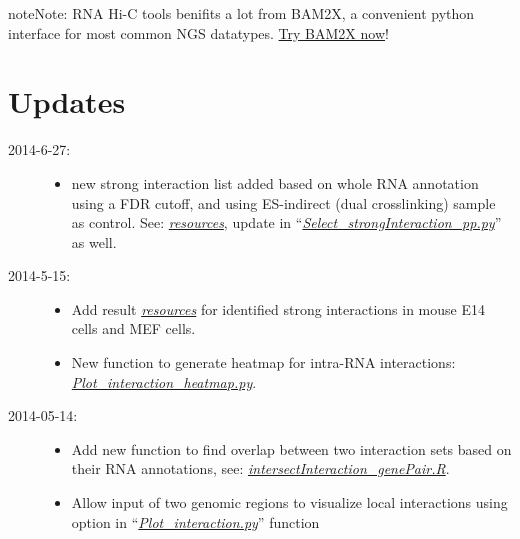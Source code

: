 \documentclass[letterpaper,10pt,english]{sphinxmanual}
\begin{document}
\begin{notice}{note}{Note:}
RNA Hi-C tools benifits a lot from BAM2X, a convenient python interface for most common NGS datatypes. \href{http://www.bam2x.net/}{Try BAM2X now}!
\end{notice}


\chapter{Updates}
\label{index:updates}\begin{description}
\item[{2014-6-27:}] \leavevmode\begin{itemize}
\item {} 
new strong interaction list added based on whole RNA annotation using a FDR cutoff, and using ES-indirect (dual crosslinking) sample as control. See: {\hyperref[Data_Resources:sifdr]{\emph{resources}}}, update in ``{\hyperref[Analysis_pipeline:step6]{\emph{Select\_strongInteraction\_pp.py}}}'' as well.

\end{itemize}

\item[{2014-5-15:}] \leavevmode\begin{itemize}
\item {} 
Add result {\hyperref[Data_Resources:resource]{\emph{resources}}} for identified strong interactions in mouse E14 cells and MEF cells.

\item {} 
New function to generate heatmap for intra-RNA interactions: {\hyperref[Visualization:visualizationheatmap]{\emph{Plot\_interaction\_heatmap.py}}}.

\end{itemize}

\item[{2014-05-14:}] \leavevmode\begin{itemize}
\item {} 
Add new function to find overlap between two interaction sets based on their RNA annotations, see: {\hyperref[Analysis_pipeline:intersectiongene]{\emph{intersectInteraction\_genePair.R}}}.

\item {} 
Allow input of two genomic regions to visualize local interactions using  option in ``{\hyperref[Visualization:plotinteraction]{\emph{Plot\_interaction.py}}}'' function

\end{itemize}


\end{description}
\end{document}

